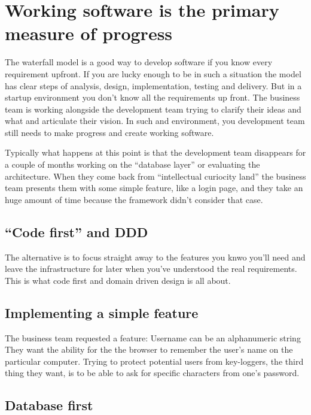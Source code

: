 \documentclass{article}
\begin{document}
\section{Working software is the primary measure of progress}

The waterfall model is a good way to develop software if you know
every requirement upfront.
%
If you are lucky enough to be in such a situation the model has clear
steps of analysis, design, implementation, testing and delivery.
%
But in a startup environment you don't know all the requirements up
front.
%
The business team is working alongside the development team trying to
clarify their ideas and what and articulate their vision.
%
In such and environment, you development team still needs to make
progress and create working software.

Typically what happens at this point is that the development team
disappears for a couple of months working on the ``database layer'' or
evaluating the architecture.
%
When they come back from ``intellectual curiocity land'' the business
team presents them with some simple feature, like a login page, and
they take an huge amount of time because the framework didn't consider
that case.


\subsection{``Code first'' and DDD}

The alternative is to focus straight away to the features you knwo
you'll need and leave the infrastructure for later when you've
understood the real requirements.
%
This is what code first and domain driven design is all about.

\subsection{Implementing a simple feature}

The business team requested a feature:
%
Username can be an alphanumeric string
%
They want the ability for the the browser to remember the user's
name on the particular computer.
%
Trying to protect potential users from key-loggers, the third thing
they want, is to be able to ask for specific characters from one's
password.

\subsection{Database first}
\end{document}

